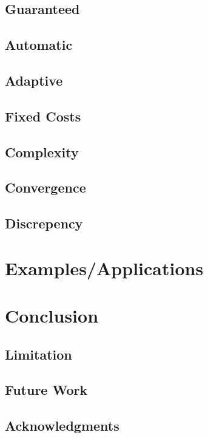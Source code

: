 \documentclass[acmtoms]{doc_acmtrans2m}%
\begin{document}
\subsection{Guaranteed}

\subsection{Automatic}

\subsection{Adaptive}

\subsection{Fixed Costs}

\subsection{Complexity}

\subsection{Convergence}

\subsection{Discrepency}


\section{Examples/Applications}
\label{sec:ex}


\section{Conclusion}
\label{sec:con}


\subsection{Limitation}


\subsection{Future Work}


\frenchspacing





\subsection*{Acknowledgments}


{\small }
\end{document}
